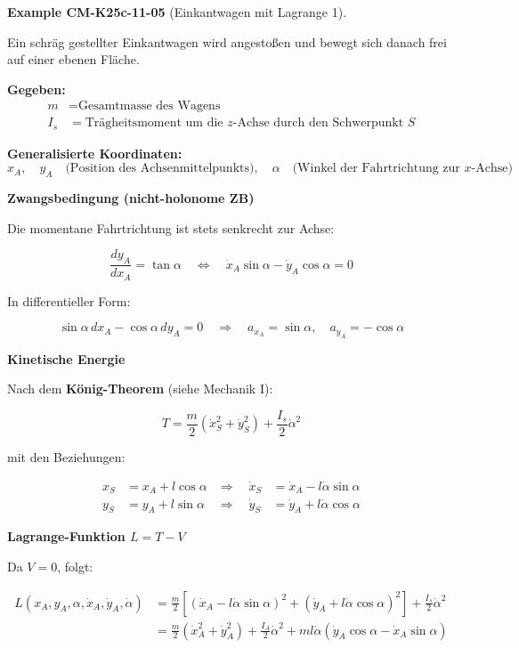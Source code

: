 \documentclass[10pt, letterpaper]{article}
\newcommand{\CustomHeading}[3]{%
  \par\medskip\noindent%
  \textbf{#1 #2} \textnormal{(#3)}.\enskip%
}
\newenvironment{EXA}[2]{\begin{unitbox}\CustomHeading{Example}{#1}{#2}}{\end{unitbox}}
\begin{document}
\begin{EXA}{CM-K25c-11-05}{Einkantwagen mit Lagrange 1}
Ein schräg gestellter Einkantwagen wird angestoßen und bewegt sich danach frei auf einer ebenen Fläche.

\vspace{1em}
\textbf{Gegeben:}
\begin{align*}
m &= \text{Gesamtmasse des Wagens} \\
I_s &= \text{Trägheitsmoment um die } z\text{-Achse durch den Schwerpunkt } S
\end{align*}

\textbf{Generalisierte Koordinaten:}
\[
x_A, \quad y_A \quad \text{(Position des Achsenmittelpunkts)}, 
\quad \alpha \quad \text{(Winkel der Fahrtrichtung zur } x\text{-Achse)}
\]

\textbf{Zwangsbedingung (nicht-holonome ZB)}

Die momentane Fahrtrichtung ist stets senkrecht zur Achse:

\[
\frac{dy_A}{dx_A} = \tan\alpha 
\quad \Leftrightarrow \quad
\dot{x}_A \sin\alpha - \dot{y}_A \cos\alpha = 0
\]

\noindent
In differentieller Form:

\[
\sin\alpha \, dx_A - \cos\alpha \, dy_A = 0
\quad \Rightarrow \quad
a_{x_A} = \sin\alpha, \quad a_{y_A} = -\cos\alpha
\]

\textbf{Kinetische Energie}

Nach dem \textbf{König-Theorem} (siehe Mechanik I):

\[
T = \frac{m}{2} (\dot{x}_S^2 + \dot{y}_S^2) + \frac{I_s}{2} \dot{\alpha}^2
\]

mit den Beziehungen:

\begin{align*}
x_S &= x_A + l \cos\alpha 
&\Rightarrow \quad \dot{x}_S &= \dot{x}_A - l \dot{\alpha} \sin\alpha \\
y_S &= y_A + l \sin\alpha 
&\Rightarrow \quad \dot{y}_S &= \dot{y}_A + l \dot{\alpha} \cos\alpha
\end{align*}

\textbf{Lagrange-Funktion \( L = T - V \)}

Da \( V = 0 \), folgt:

\begin{align*}
L(x_A, y_A, \alpha, \dot{x}_A, \dot{y}_A, \dot{\alpha}) 
&= \frac{m}{2} \left[ (\dot{x}_A - l \dot{\alpha} \sin\alpha)^2 + (\dot{y}_A + l \dot{\alpha} \cos\alpha)^2 \right] + \frac{I_s}{2} \dot{\alpha}^2 \\[1ex]
&= \frac{m}{2} (\dot{x}_A^2 + \dot{y}_A^2) 
+ \frac{I_A}{2} \dot{\alpha}^2 
+ m l \dot{\alpha} ( \dot{y}_A \cos\alpha - \dot{x}_A \sin\alpha )
\end{align*}


\end{EXA}
\end{document}
